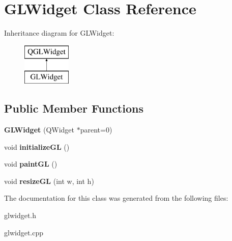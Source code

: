 \hypertarget{class_g_l_widget}{}\section{G\+L\+Widget Class Reference}
\label{class_g_l_widget}
Inheritance diagram for G\+L\+Widget\+:\begin{figure}[H]
\begin{center}
\leavevmode
\includegraphics[height=2.000000cm]{class_g_l_widget}
\end{center}
\end{figure}
\subsection*{Public Member Functions}
\begin{DoxyCompactItemize}
\item 
\mbox{\label{class_g_l_widget_ab79c391c86de1ffb76f6950b49d82c0c}} 
{\bfseries G\+L\+Widget} (Q\+Widget $\ast$parent=0)
\item 
\mbox{\label{class_g_l_widget_a7fab13e8cc9fc0730ca54c08b2c923a7}} 
void {\bfseries initialize\+GL} ()
\item 
\mbox{\label{class_g_l_widget_a640b5570cb2b37724fd5b58a77339c5e}} 
void {\bfseries paint\+GL} ()
\item 
\mbox{\label{class_g_l_widget_a5e960cecb41f3937742f76a0a9103c88}} 
void {\bfseries resize\+GL} (int w, int h)
\end{DoxyCompactItemize}


The documentation for this class was generated from the following files\+:\begin{DoxyCompactItemize}
\item 
glwidget.\+h\item 
glwidget.\+cpp\end{DoxyCompactItemize}
